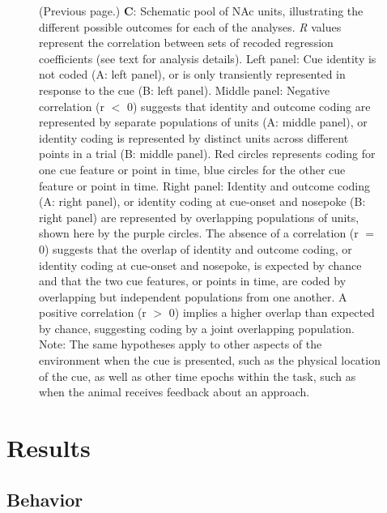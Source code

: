\documentclass[11pt]{article}
\newcommand{\bsf}[1]{\textbf{#1}}
\begin{document}
\addtocounter{figure}{-1}
\begin{figure} [t!]
  \caption{(Previous page.) \bsf{C}: Schematic pool of NAc units, illustrating the different possible outcomes for each of the analyses. {\it R} values represent the correlation between sets of recoded regression coefficients (see text for analysis details). Left panel: Cue identity is not coded (A: left panel), or is only transiently represented in response to the cue (B: left panel). Middle panel: Negative correlation (r $<$ 0) suggests that identity and outcome coding are represented by separate populations of units (A: middle panel), or identity coding is represented by distinct units across different points in a trial (B: middle panel). Red circles represents coding for one cue feature or point in time, blue circles for the other cue feature or point in time. Right panel: Identity and outcome coding (A: right panel), or identity coding at cue-onset and nosepoke (B: right panel) are represented by overlapping populations of units, shown here by the purple circles. The absence of a correlation (r $=$ 0) suggests that the overlap of identity and outcome coding, or identity coding at cue-onset and nosepoke, is expected by chance and that the two cue features, or points in time, are coded by overlapping but independent populations from one another. A positive correlation (r $>$ 0) implies a higher overlap than expected by chance, suggesting coding by a joint overlapping population. Note: The same hypotheses apply to other aspects of the environment when the cue is presented, such as the physical location of the cue, as well as other time epochs within the task, such as when the animal receives feedback about an approach.}
\end{figure}

\section*{Results}

\subsection*{Behavior}
\end{document}
